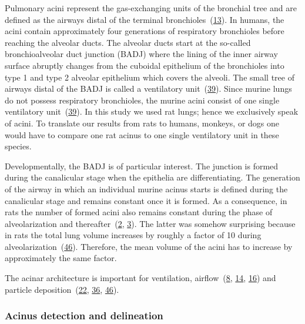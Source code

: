 \documentclass[
  american,
]{article}
\begin{document}
Pulmonary acini represent the gas-exchanging units of the bronchial tree and are defined as the airways distal of the terminal bronchioles~(\protect\hyperlink{ref-BbEFwEVD}{13}).
In humans, the acini contain approximately four generations of respiratory bronchioles before reaching the alveolar ducts.
The alveolar ducts start at the so-called bronchioalveolar duct junction (BADJ) where the lining of the inner airway surface abruptly changes from the cuboidal epithelium of the bronchioles into type 1 and type 2 alveolar epithelium which covers the alveoli.
The small tree of airways distal of the BADJ is called a ventilatory unit~(\protect\hyperlink{ref-WDrIHn9p}{39}).
Since murine lungs do not possess respiratory bronchioles, the murine acini consist of one single ventilatory unit~(\protect\hyperlink{ref-WDrIHn9p}{39}).
In this study we used rat lungs; hence we exclusively speak of acini.
To translate our results from rats to humans, monkeys, or dogs one would have to compare one rat acinus to one single ventilatory unit in these species.

Developmentally, the BADJ is of particular interest.
The junction is formed during the canalicular stage when the epithelia are differentiating.
The generation of the airway in which an individual murine acinus starts is defined during the canalicular stage and remains constant once it is formed.
As a consequence, in rats the number of formed acini also remains constant during the phase of alveolarization and thereafter~(\protect\hyperlink{ref-14OP85b2F}{2}, \protect\hyperlink{ref-uFNlWogb}{3}).
The latter was somehow surprising because in rats the total lung volume increases by roughly a factor of 10 during alveolarization~(\protect\hyperlink{ref-wnl86DEM}{46}).
Therefore, the mean volume of the acini has to increase by approximately the same factor.

The acinar architecture is important for ventilation, airflow~(\protect\hyperlink{ref-CVl41LwO}{8}, \protect\hyperlink{ref-eb0gk6VO}{14}, \protect\hyperlink{ref-1DP2FRUSZ}{16}) and particle deposition~(\protect\hyperlink{ref-18DcNLAv6}{22}, \protect\hyperlink{ref-yHHhvOtP}{36}, \protect\hyperlink{ref-wnl86DEM}{46}).

\hypertarget{acinus-detection-and-delineation}{%
\subsubsection{Acinus detection and delineation}\label{acinus-detection-and-delineation}}
\end{document}
